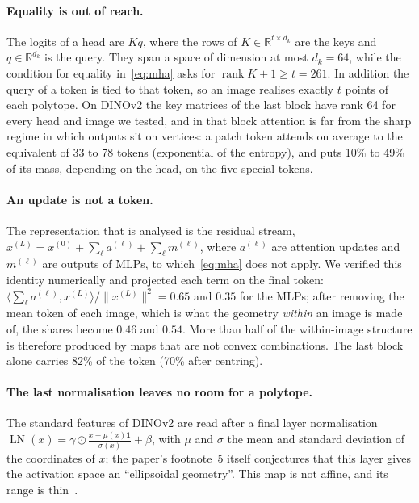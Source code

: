 \documentclass[sigconf,nonacm,screen]{acmart}
\newcommand{\R}{\mathbb{R}}
\newcommand{\LN}{\operatorname{LN}}
\newcommand{\one}{\mathbf{1}}
\newcommand{\rank}{\operatorname{rank}}
\begin{document}
\paragraph{Equality is out of reach.} The logits of a head are $Kq$, where the rows of
$K\in\R^{t\times d_k}$ are the keys and $q\in\R^{d_k}$ is the query. They span a space of dimension at most
$d_k=64$, while the condition for equality in~\eqref{eq:mha} asks for $\rank K+1\ge t=261$. In addition
the query of a token is tied to that token, so an image realises exactly $t$ points of each polytope.
On DINOv2 the key matrices of the last block have rank 64 for every head and image we tested, and in that block attention
is far from the sharp regime in which outputs sit on vertices: a patch token attends on average to the
equivalent of 33 to 78 tokens (exponential of the entropy), and puts 10\% to 49\% of its mass, depending
on the head, on the five special tokens.

\paragraph{An update is not a token.} The representation that is analysed is the residual stream,
$x^{(L)}=x^{(0)}+\sum_{\ell}a^{(\ell)}+\sum_\ell m^{(\ell)}$, where $a^{(\ell)}$ are attention updates and
$m^{(\ell)}$ are outputs of MLPs, to which~\eqref{eq:mha} does not apply. We verified this identity numerically and projected each term on the final token:
$\langle\sum_\ell a^{(\ell)},x^{(L)}\rangle/\|x^{(L)}\|^2=0.65$ and $0.35$ for the MLPs; after removing
the mean token of each image, which is what the geometry \emph{within} an image is made of, the shares
become $0.46$ and $0.54$. More than half of the within-image structure is therefore produced by maps that
are not convex combinations. The last block alone carries 82\% of the token (70\% after centring).

\paragraph{The last normalisation leaves no room for a polytope.} The standard features of DINOv2
are read after a final layer normalisation $\LN(x)=\gamma\odot\frac{x-\mu(x)\one}{\sigma(x)}+\beta$, with
$\mu$ and $\sigma$ the mean and standard deviation of the coordinates of $x$; the paper's footnote~5 itself
conjectures that this layer gives the activation space an ``ellipsoidal geometry''. This map is not affine, and
its range is thin~\cite{brody2023expressivity}.
\end{document}
